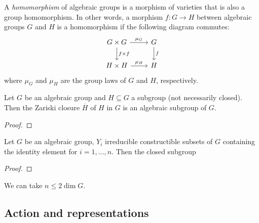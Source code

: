     \begin{definition}\label{def:homomorphism_of_algebraic_groups}
        A \emph{homomorphism} of algebraic groups is a morphism of varieties that is also a group homomorphism.
        In other words, a morphism \(f: G \to H\) between algebraic groups \(G\) and \(H\) is a homomorphism if the following diagram commutes:
        \[
            \begin{tikzcd}
                G \times G \arrow{r}{\mu_G} \arrow{d}{f \times f} & G \arrow{d}{f} \\
                H \times H \arrow{r}{\mu_H} & H
            \end{tikzcd}
        \]
        where \(\mu_G\) and \(\mu_H\) are the group laws of \(G\) and \(H\), respectively.
    \end{definition}

    \begin{proposition}\label{prop:closure_of_subgroup_is_subgroup}
        Let \(G\) be an algebraic group and \(H \subseteq G\) a subgroup (not necessarily closed).
        Then the Zariski closure \(\overline{H}\) of \(H\) in \(G\) is an algebraic subgroup of \(G\).
    \end{proposition}
    \begin{proof}
    \end{proof}

    \begin{proposition}\label{prop:generate_subgroup_by_irred_constructible_subset}
        Let \(G\) be an algebraic group, \(Y_i\) irreducible constructible subsets of \(G\) containing the identity element for \(i=1,\ldots,n\).
        Then the closed subgroup 
    \end{proposition}
    \begin{proof}
    \end{proof}

    \begin{remark}\label{rmk:generated_subgroup_by_irred_constructible_subset}
        We can take \(n \leq 2 \dim G\).
    \end{remark}


\subsection{Action and representations}

